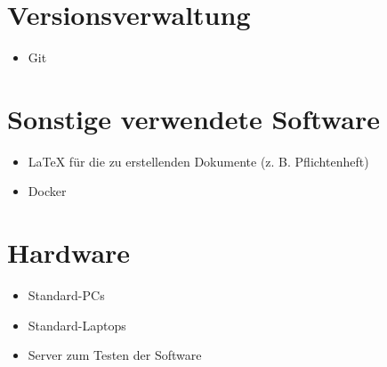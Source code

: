 \documentclass[a4paper,20pt,oneside]{book}
\begin{document}
\section{Versionsverwaltung}
\begin{itemize}
\item Git
\end{itemize}

\section{Sonstige verwendete Software}
\begin{itemize}
\item LaTeX für die zu erstellenden Dokumente (z. B. Pflichtenheft)
\item\Gls{Docker}
\end{itemize}

\section{Hardware}
\begin{itemize}
\item Standard-PCs
\item Standard-Laptops
\item Server zum Testen der Software
\end{itemize}

\printglossaries
\end{document}
